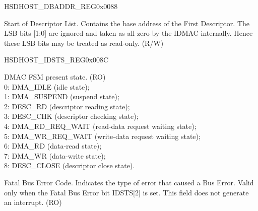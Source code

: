 \begin{register}{H}{SDHOST\_DBADDR\_REG}{0x{}0088}\label{regdesc:DBADDRREG}
%
\regnewline%
\begin{regdesc}\begin{reglist}
\item [SDHOST\_DBADDR\_REG]Start of Descriptor List. Contains the base address of the First Descriptor. The LSB bits [1:0] are ignored and taken as all-zero by the IDMAC internally. Hence these LSB bits may be treated as read-only. (R/W)
\end{reglist}\end{regdesc}
\end{register}


\begin{register}{H}{SDHOST\_IDSTS\_REG}{0x{}008C}\label{regdesc:IDSTSREG}
%
%
%
%
%
%
%
%
%
%
%
%
\regnewline%
\begin{regdesc}\begin{reglist}
\item [SDHOST\_IDSTS\_FSM]DMAC FSM present state. (RO)\\
0: DMA\_IDLE (idle state); \\
1: DMA\_SUSPEND (suspend state); \\
2: DESC\_RD (descriptor reading state); \\
3: DESC\_CHK (descriptor checking state); \\
4: DMA\_RD\_REQ\_WAIT (read-data request waiting state);\\
5: DMA\_WR\_REQ\_WAIT (write-data request waiting state); \\
6: DMA\_RD (data-read state); \\
7: DMA\_WR (data-write state); \\
8: DESC\_CLOSE (descriptor close state).
\item [SDHOST\_IDSTS\_FBE\_CODE]Fatal Bus Error Code. Indicates the type of error that caused a Bus Error. Valid only when the Fatal Bus Error bit IDSTS[2] is set. This field does not generate an interrupt. (RO)\\

\end{reglist}
\end{regdesc}
\end{register}
